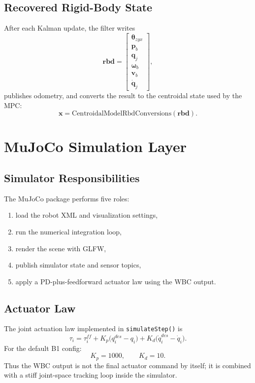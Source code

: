 \documentclass[11pt,a4paper]{article}
\newcommand{\vect}[1]{\bm{#1}}
\newcommand{\code}[1]{\texttt{#1}}
\begin{document}
\subsection{Recovered Rigid-Body State}
After each Kalman update, the filter writes
\begin{equation}
\vect{rbd} =
\begin{bmatrix}
\vect{\theta}_{zyx} \\
\vect{p}_b \\
\vect{q}_j \\
\vect{\omega}_b \\
\vect{v}_b \\
\dot{\vect{q}}_j
\end{bmatrix},
\end{equation}
publishes odometry, and converts the result to the centroidal state used by the MPC:
\begin{equation}
\vect{x} = \mathrm{CentroidalModelRbdConversions}(\vect{rbd}).
\end{equation}

\section{MuJoCo Simulation Layer}
\subsection{Simulator Responsibilities}
The MuJoCo package performs five roles:
\begin{enumerate}[leftmargin=*]
\item load the robot XML and visualization settings,
\item run the numerical integration loop,
\item render the scene with GLFW,
\item publish simulator state and sensor topics,
\item apply a PD-plus-feedforward actuator law using the WBC output.
\end{enumerate}

\subsection{Actuator Law}
The joint actuation law implemented in \code{simulateStep()} is
\begin{equation}
\tau_i =
\tau_i^{ff}
+ K_p \big(q_i^{des} - q_i\big)
+ K_d \big(\dot{q}_i^{des} - \dot{q}_i\big).
\end{equation}
For the default B1 config:
\begin{equation}
K_p = 1000,\qquad K_d = 10.
\end{equation}
Thus the WBC output is not the final actuator command by itself; it is combined with a stiff joint-space tracking loop inside the simulator.
\end{document}
